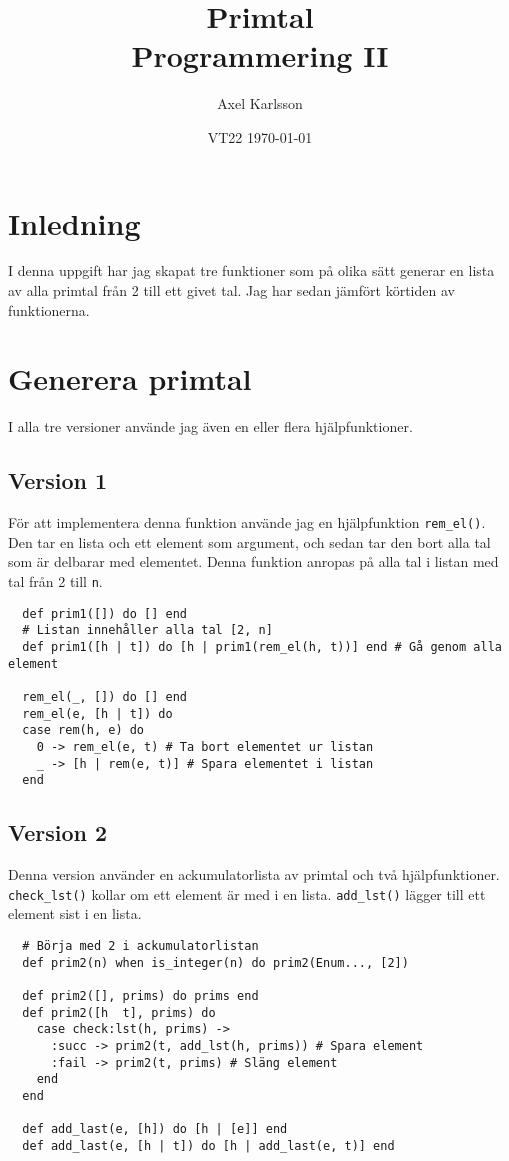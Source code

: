 \documentclass[a4paper,11pt]{article}
\begin{document}
\title{
  \textbf{Primtal\\
  \small Programmering II}
}
\author{Axel Karlsson}
\date{VT22 \today}

\maketitle

\section*{Inledning}
I denna uppgift har jag skapat tre funktioner som på olika sätt generar en lista av alla primtal från 2 till ett givet tal. Jag har sedan jämfört körtiden av funktionerna.

\section*{Generera primtal}
I alla tre versioner använde jag även en eller flera hjälpfunktioner.
\subsection*{Version 1}
För att implementera denna funktion använde jag en hjälpfunktion {\tt rem\_el()}. Den tar en lista och ett element som argument, och sedan tar den bort alla tal som är delbarar med elementet. Denna funktion anropas på alla tal i listan med tal från 2 till {\tt n}.

\begin{verbatim}
  def prim1([]) do [] end
  # Listan innehåller alla tal [2, n]
  def prim1([h | t]) do [h | prim1(rem_el(h, t))] end # Gå genom alla element

  rem_el(_, []) do [] end
  rem_el(e, [h | t]) do
  case rem(h, e) do
    0 -> rem_el(e, t) # Ta bort elementet ur listan
    _ -> [h | rem(e, t)] # Spara elementet i listan
  end
\end{verbatim}

\subsection*{Version 2}
Denna version använder en ackumulatorlista av primtal och två hjälpfunktioner. {\tt check\_lst()} kollar om ett element är med i en lista. {\tt add\_lst()} lägger till ett element sist i en lista.
\begin{verbatim}
  # Börja med 2 i ackumulatorlistan
  def prim2(n) when is_integer(n) do prim2(Enum..., [2])
  
  def prim2([], prims) do prims end
  def prim2([h  t], prims) do
    case check:lst(h, prims) ->
      :succ -> prim2(t, add_lst(h, prims)) # Spara element
      :fail -> prim2(t, prims) # Släng element
    end
  end
  
  def add_last(e, [h]) do [h | [e]] end
  def add_last(e, [h | t]) do [h | add_last(e, t)] end
\end{verbatim}
\end{document}
